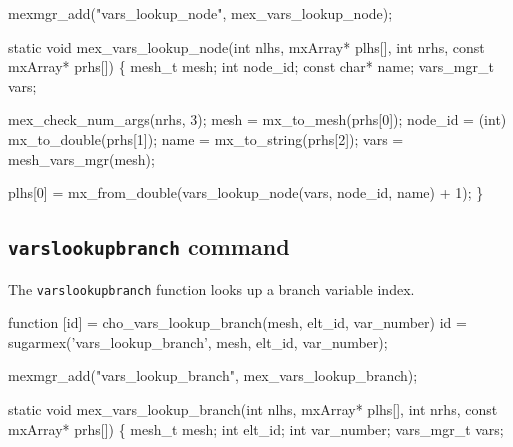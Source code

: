 \nwenddocs{}\plusendmoddef
mexmgr_add("vars_lookup_node", mex_vars_lookup_node);
\nwendcode{}\nwdocspar

\nwenddocs{}\plusendmoddef
static void mex_vars_lookup_node(int nlhs, mxArray* plhs[],
                                 int nrhs, const mxArray* prhs[])
\{
    mesh_t      mesh;
    int         node_id;
    const char* name;
    vars_mgr_t  vars;

    mex_check_num_args(nrhs, 3);
    mesh    = mx_to_mesh(prhs[0]);
    node_id = (int) mx_to_double(prhs[1]);
    name    = mx_to_string(prhs[2]);
    vars    = mesh_vars_mgr(mesh);

    plhs[0] = mx_from_double(vars_lookup_node(vars, node_id, name) + 1);
\}

\nwendcode{}\nwdocspar
 

\subsection{{\tt{}vars{}lookup{}branch} command}

The {\tt{}vars{}lookup{}branch} function looks up a branch variable index.

\nwenddocs{}\endmoddef
function [id] = cho_vars_lookup_branch(mesh, elt_id, var_number)
id = sugarmex('vars_lookup_branch', mesh, elt_id, var_number);
\nwendcode{}\nwdocspar

\nwenddocs{}\plusendmoddef
mexmgr_add("vars_lookup_branch", mex_vars_lookup_branch);
\nwendcode{}\nwdocspar

\nwenddocs{}\plusendmoddef
static void mex_vars_lookup_branch(int nlhs, mxArray* plhs[],
                                   int nrhs, const mxArray* prhs[])
\{
    mesh_t      mesh;
    int         elt_id;
    int         var_number;
    vars_mgr_t  vars;

